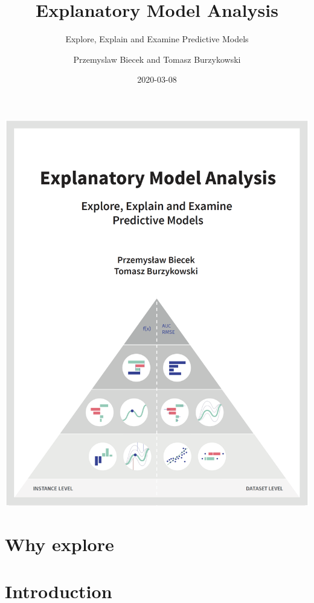 \documentclass[12pt,]{krantz}
\title{Explanatory Model Analysis}
\subtitle{Explore, Explain and Examine Predictive Models}
\author{Przemyslaw Biecek and Tomasz Burzykowski}
\date{2020-03-08}
\begin{document}
\maketitle

{
\hypersetup{linkcolor=black}
\setcounter{tocdepth}{2}
\tableofcontents
}
\listoftables
\listoffigures
\begin{center}\includegraphics[width=0.99\linewidth]{figure/front4} \end{center}

\hypertarget{why-explore}{%
\section*{Why explore}\label{why-explore}}

\hypertarget{introduction}{%
\section{Introduction}\label{introduction}}
\end{document}
